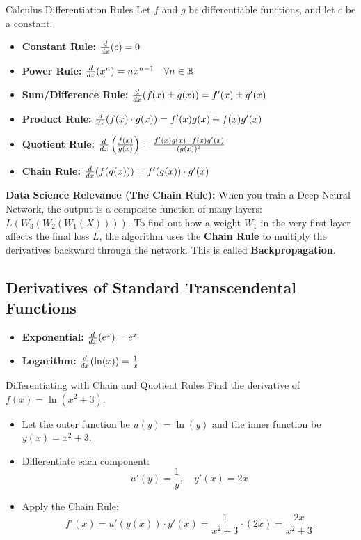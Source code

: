 \begin{theorembox}{Calculus Differentiation Rules}
Let $f$ and $g$ be differentiable functions, and let $c$ be a constant.
\begin{itemize}
    \item \textbf{Constant Rule:} $\frac{d}{dx}(c) = 0$
    \item \textbf{Power Rule:} $\frac{d}{dx}(x^n) = n x^{n-1} \quad \forall n \in \mathbb{R}$
    \item \textbf{Sum/Difference Rule:} $\frac{d}{dx}(f(x) \pm g(x)) = f'(x) \pm g'(x)$
    \item \textbf{Product Rule:} $\frac{d}{dx}(f(x) \cdot g(x)) = f'(x)g(x) + f(x)g'(x)$
    \item \textbf{Quotient Rule:} $\frac{d}{dx}\left(\frac{f(x)}{g(x)}\right) = \frac{f'(x)g(x) - f(x)g'(x)}{(g(x))^2}$
    \item {}\textbf{Chain Rule:} $\frac{d}{dx}(f(g(x))) = f'(g(x)) \cdot g'(x)$
\end{itemize}
\end{theorembox}

\textbf{Data Science Relevance (The Chain Rule):} When you train a Deep Neural Network, the output is a composite function of many layers: $L(W_3(W_2(W_1(X))))$. To find out how a weight $W_1$ in the very first layer affects the final loss $L$, the algorithm uses the \textbf{Chain Rule} to multiply the derivatives backward through the network. This is called \textbf{Backpropagation}.

\subsection{Derivatives of Standard Transcendental Functions}
\begin{itemize}
    \item \textbf{Exponential:} $\frac{d}{dx}(e^x) = e^x$
    \item \textbf{Logarithm:} $\frac{d}{dx}(\ln(x)) = \frac{1}{x}$
\end{itemize}

\begin{examplebox}{Differentiating with Chain and Quotient Rules}
Find the derivative of $f(x) = \ln(x^2 + 3)$.
\begin{itemize}
    \item Let the outer function be $u(y) = \ln(y)$ and the inner function be $y(x) = x^2 + 3$.
    \item Differentiate each component:
    $$u'(y) = \frac{1}{y}, \quad y'(x) = 2x$$
    \item Apply the Chain Rule:
    $$f'(x) = u'(y(x)) \cdot y'(x) = \frac{1}{x^2 + 3} \cdot (2x) = \frac{2x}{x^2 + 3}$$
\end{itemize}
\end{examplebox}

